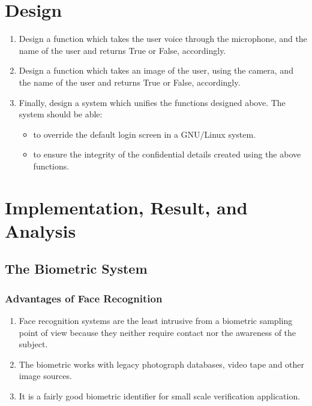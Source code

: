 \chapter{Design}
\begin{enumerate}
  \item Design a function which takes the user voice through the microphone,
        and the name of the user and returns True or False, accordingly.
  \item Design a function which takes an image of the user, using the camera,
        and the name of the user and returns True or False, accordingly.
  \item Finally, design a system which unifies the functions designed above.
        The system should be able:
        \begin{itemize}
          \item to override the default login screen in a GNU/Linux system.
          \item to ensure the integrity of the confidential details created
                using the above functions.
        \end{itemize}
\end{enumerate}

\chapter{Implementation, Result, and Analysis}

\section{The Biometric System}

\subsection{Advantages of Face Recognition}

\begin{enumerate}
  \item Face recognition systems are the least intrusive from a biometric sampling point of view because they neither require contact nor the awareness of the subject.
  \item The biometric works with legacy photograph databases, video tape and other image sources.
  \item It is a fairly good biometric identifier for small scale verification application.
\end{enumerate}

